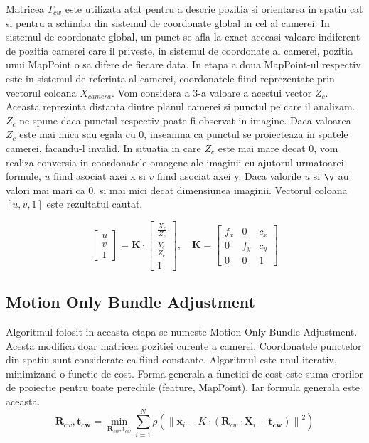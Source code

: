 \documentclass[12pt,a4paper]{report}
\begin{document}
Matricea \(T_{cw}\) este utilizata atat pentru a descrie pozitia si orientarea in spatiu 
cat si pentru a schimba din sistemul de coordonate global in cel al camerei.
In sistemul de coordonate global, un punct se afla la exact aceeasi valoare indiferent 
de pozitia camerei care il priveste, in sistemul de coordonate al camerei, pozitia unui 
MapPoint o sa difere de fiecare data.
In etapa a doua MapPoint-ul respectiv este in sistemul de referinta al camerei, 
coordonatele fiind reprezentate prin vectorul coloana \(X_{camera}\). Vom considera 
a 3-a valoare a acestui vector \(Z_c\). Aceasta reprezinta distanta dintre planul camerei
si punctul pe care il analizam. \(Z_c\) ne spune daca punctul respectiv poate fi observat
in imagine. Daca valoarea \(Z_c\) este mai mica sau egala cu 0, inseamna ca punctul 
se proiecteaza in spatele camerei, facandu-l invalid. In situatia in care \(Z_c\) este 
mai mare decat 0, vom realiza conversia in coordonatele omogene ale imaginii cu ajutorul
urmatoarei formule, \(u\) fiind asociat axei x si \(v\) fiind asociat axei y. Daca 
valorile \(u\) si \(\v\) au valori mai mari ca 0, si mai mici decat dimensiunea imaginii.
Vectorul coloana \([u, v, 1]\) este rezultatul cautat. 

\begin{equation}
    \begin{bmatrix}
        u \\
        v \\
        1
        \end{bmatrix}
        =
        \mathbf{K} \cdot
        \begin{bmatrix}
        \frac{X_c}{Z_c} \\
        \frac{Y_c}{Z_c} \\
        1 
        \end{bmatrix}, \quad{}
        \mathbf{K} =
        \begin{bmatrix}
        f_x & 0 & c_x \\
        0 & f_y & c_y \\
        0 & 0 & 1
        \end{bmatrix}
\end{equation} 


\subsection{Motion Only Bundle Adjustment}
Algoritmul folosit in aceasta etapa se numeste Motion Only Bundle Adjustment. Acesta 
modifica doar matricea pozitiei curente a camerei. Coordonatele punctelor din spatiu sunt
considerate ca fiind constante. Algoritmul este unul iterativ, minimizand o functie de cost.
Forma generala a functiei de cost este suma erorilor de proiectie pentru toate perechile
(feature, MapPoint). Iar formula generala este aceasta.
 \begin{equation}
    \mathbf{R}_{cw}, \mathbf{t_{cw}} = \min_{\mathbf{R}_{cw}, t_{cw}} \sum_{i=1}^{N} \rho\left( \left\| \mathbf{x}_i - K \cdot \left( \mathbf{R}_{cw} \cdot \mathbf{X}_i + \mathbf{t_{cw}} \right) \right\|^2 \right)
\end{equation}
\end{document}

